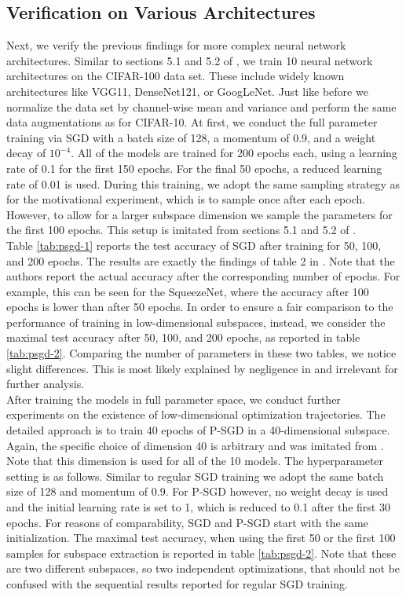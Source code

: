 \documentclass[11pt, a4paper]{article}
\begin{document}
\subsection{Verification on Various Architectures} \label{sec:verify}

Next, we verify the previous findings for more complex neural network architectures. Similar to sections 5.1 and 5.2 of \cite{Paper}, we train 10 neural network architectures on the CIFAR-100 data set. These include widely known architectures like VGG11, DenseNet121, or GoogLeNet. Just like before we normalize the data set by channel-wise mean and variance and perform the same data augmentations as for CIFAR-10. At first, we conduct the full parameter training via SGD with a batch size of 128, a momentum of 0.9, and a weight decay of $10^{-4}$. All of the models are trained for 200 epochs each, using a learning rate of 0.1 for the first 150 epochs.  For the final 50 epochs, a reduced learning rate of 0.01 is used. During this training, we adopt the same sampling strategy as for the motivational experiment, which is to sample once after each epoch. However, to allow for a larger subspace dimension we sample the parameters for the first 100 epochs. This setup is imitated from sections 5.1 and 5.2 of \cite{Paper}. \\

Table \ref{tab:psgd-1} reports the test accuracy of SGD after training for 50, 100, and 200 epochs. The results are exactly the findings of table 2 in \cite{Paper}. Note that the authors report the actual accuracy after the corresponding number of epochs. For example, this can be seen for the SqueezeNet, where the accuracy after 100 epochs is lower than after 50 epochs. In order to ensure a fair comparison to the performance of training in low-dimensional subspaces, instead, we consider the maximal test accuracy after 50, 100, and 200 epochs, as reported in table \ref{tab:psgd-2}. Comparing the number of parameters in these two tables, we notice slight differences. This is most likely explained by negligence in \cite{Paper} and irrelevant for further analysis. \\

After training the models in full parameter space, we conduct further experiments on the existence of low-dimensional optimization trajectories. The detailed approach is to train 40 epochs of P-SGD in a 40-dimensional subspace. Again, the specific choice of dimension 40 is arbitrary and was imitated from \cite{Paper}. Note that this dimension is used for all of the 10 models. The hyperparameter setting is as follows. Similar to regular SGD training we adopt the same batch size of 128 and momentum of 0.9. For P-SGD however, no weight decay is used and the initial learning rate is set to 1, which is reduced to 0.1 after the first 30 epochs. For reasons of comparability, SGD and P-SGD start with the same initialization. The maximal test accuracy, when using the first 50 or the first 100 samples for subspace extraction is reported in table \ref{tab:psgd-2}. Note that these are two different subspaces, so two independent optimizations, that should not be confused with the sequential results reported for regular SGD training. 
\end{document}
